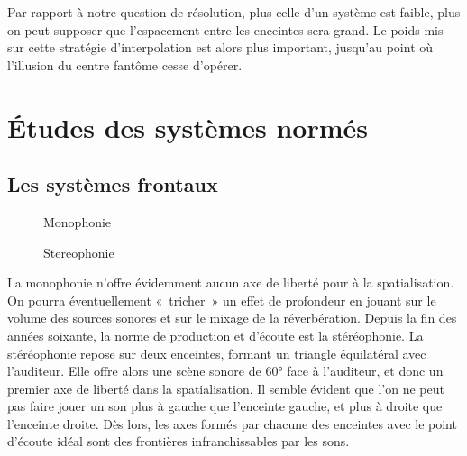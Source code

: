\documentclass[
  letterpaper,
  DIV=11,
  numbers=noendperiod]{scrreprt}
\begin{document}
Par rapport à notre question de résolution, plus celle d'un système est
faible, plus on peut supposer que l'espacement entre les enceintes sera
grand. Le poids mis sur cette stratégie d'interpolation est alors plus
important, jusqu'au point où l'illusion du centre fantôme cesse
d'opérer.

\hypertarget{uxe9tudes-des-systuxe8mes-normuxe9s}{%
\section{Études des systèmes
normés}\label{uxe9tudes-des-systuxe8mes-normuxe9s}}

\hypertarget{les-systuxe8mes-frontaux}{%
\subsection{Les systèmes frontaux}\label{les-systuxe8mes-frontaux}}

\begin{figure}

\begin{minipage}[t]{0.50\linewidth}

{\centering 


\caption{Monophonie}

}

\end{minipage}%
%
\begin{minipage}[t]{0.50\linewidth}

{\centering 


\caption{Stereophonie}

}

\end{minipage}%

\end{figure}

La monophonie n'offre évidemment aucun axe de liberté pour à la
spatialisation. On pourra éventuellement «~tricher~» un effet de
profondeur en jouant sur le volume des sources sonores et sur le mixage
de la réverbération. Depuis la fin des années soixante, la norme de
production et d'écoute est la stéréophonie. La stéréophonie repose sur
deux enceintes, formant un triangle équilatéral avec l'auditeur. Elle
offre alors une scène sonore de 60° face à l'auditeur, et donc un
premier axe de liberté dans la spatialisation. Il semble évident que
l'on ne peut pas faire jouer un son plus à gauche que l'enceinte gauche,
et plus à droite que l'enceinte droite. Dès lors, les axes formés par
chacune des enceintes avec le point d'écoute idéal sont des frontières
infranchissables par les sons.
\end{document}
